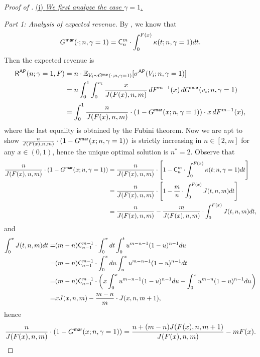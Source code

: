 \begin{proof}[{Proof of }]

\underline{(i) \textit{We first analyze the case $\gamma = 1$.}}

\medskip

\noindent\textit{Part 1: Analysis of expected revenue.} By , we know that  $$G^{\mathsf{mar}}(\cdot; n,\gamma=1) = \mathsf{C}_n^m \cdot \int_0^{F(x)}\kappa(t;n,\gamma=1)dt.$$ Then the expected revenue is
\begin{align*}
 \mathsf{R}^{\mathsf{AP}}(n;\gamma=1,F) & = n\cdot \mathbb{E}_{V_i\sim G^{\mathsf{mar}}(\cdot; n,\gamma=1)}[\sigma^{\mathsf{AP}}(V_i;n,\gamma=1)]\\
 &= n\int_0^1 \int_0^{v_i} \frac{x}{J(F(x),n,m)}\, dF^{m-1}(x)\, dG^{\mathsf{mar}}(v_i;n,\gamma=1)\\[1mm]
 &= \int_0^1 \frac{n}{J(F(x),n,m)} \cdot \left(1-G^{\mathsf{mar}}(x; n,\gamma=1)\right) \cdot x\, dF^{m-1}(x),
\end{align*}
where the last equality is obtained by the Fubini theorem.
Now we are apt to show $\frac{n}{J(F(x),n,m)}\cdot \left(1-G^{\mathsf{mar}}(x;n,\gamma=1)\right)$ is strictly increasing in $n\in [2, m]$ for any $x\in (0,1)$, hence the unique optimal solution is $n^*=2$. Observe that 
\begin{align*}
\frac{n}{J(F(x),n,m)}\cdot (1-G^{\mathsf{mar}}(x;n,\gamma=1))  
& =  \frac{n}{J(F(x),n,m)}\cdot \left[1- \mathsf{C}_n^m \cdot \int_0^{F(x)}\kappa(t;n,\gamma=1)dt\right]\\
& = \frac{n}{J(F(x),n,m)}\cdot \left[1- \frac{m}{n} \cdot \int_0^{F(x)}J(t,n,m)dt\right]\\
& = \frac{n}{J(F(x),n,m)} - \frac{m}{J(F(x),n,m)}\cdot \int_0^{F(x)} J(t,n,m)dt,
\end{align*}
and 
\begin{align*}
\int_0^x J(t,n,m)dt =& (m-n)\mathsf{C}_{n-1}^{m-1}  \cdot\int_{0}^xdt\int_0^t u^{m-n-1}(1-u)^{n-1}du \\
=& (m-n)\mathsf{C}_{n-1}^{m-1} \cdot\int_{0}^xdu\int_u^x u^{m-n-1}(1-u)^{n-1}dt\\
=& (m-n)\mathsf{C}_{n-1}^{m-1} \cdot \left(x\int_0^xu^{m-n-1}(1-u)^{n-1}du - \int_0^xu^{m-n}(1-u)^{n-1}du\right)\\
=& xJ(x,n,m) - \frac{m-n}{m}\cdot J(x,n,m+1),
\end{align*}
hence 
\begin{align*}
    \frac{n}{J(F(x),n,m)}\cdot (1-G^{\mathsf{mar}}(x;n,\gamma=1))   = 
 \frac{n + (m-n)J(F(x),n,m+1)}{J(F(x),n,m)} -mF(x).
\end{align*}

\end{proof}
